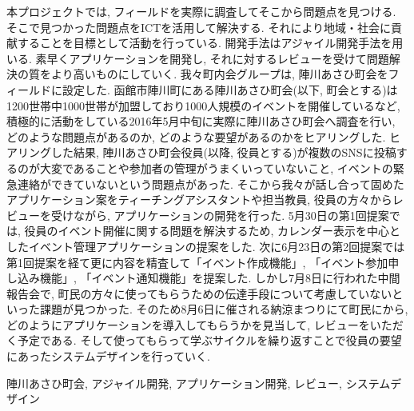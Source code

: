 \begin{jabstract}
\quad 本プロジェクトでは, フィールドを実際に調査してそこから問題点を見つける. そこで見つかった問題点をICTを活用して解決する. それにより地域・社会に貢献することを目標として活動を行っている. 開発手法はアジャイル開発手法を用いる. 素早くアプリケーションを開発し, それに対するレビューを受けて問題解決の質をより高いものにしていく.
我々町内会グループは, 陣川あさひ町会をフィールドに設定した. 函館市陣川町にある陣川あさひ町会(以下, 町会とする)は1200世帯中1000世帯が加盟しており1000人規模のイベントを開催しているなど, 積極的に活動をしている2016年5月中旬に実際に陣川あさひ町会へ調査を行い, どのような問題点があるのか, どのような要望があるのかをヒアリングした. ヒアリングした結果, 陣川あさひ町会役員(以降, 役員とする)が複数のSNSに投稿するのが大変であることや参加者の管理がうまくいっていないこと, イベントの緊急連絡ができていないという問題点があった. そこから我々が話し合って固めたアプリケーション案をティーチングアシスタントや担当教員, 役員の方々からレビューを受けながら, アプリケーションの開発を行った.
5月30日の第1回提案では, 役員のイベント開催に関する問題を解決するため, カレンダー表示を中心としたイベント管理アプリケーションの提案をした. 次に6月23日の第2回提案では第1回提案を経て更に内容を精査して「イベント作成機能」, 「イベント参加申し込み機能」, 「イベント通知機能」を提案した. しかし7月8日に行われた中間報告会で,
町民の方々に使ってもらうための伝達手段について考慮していないといった課題が見つかった. そのため8月6日に催される納涼まつりにて町民にから, どのようにアプリケーションを導入してもらうかを見当して, レビューをいただく予定である. そして使ってもらって学ぶサイクルを繰り返すことで役員の要望にあったシステムデザインを行っていく.

\begin{jkeyword}
陣川あさひ町会, アジャイル開発, アプリケーション開発, レビュー, システムデザイン
\end{jkeyword}
\end{jabstract}
​
